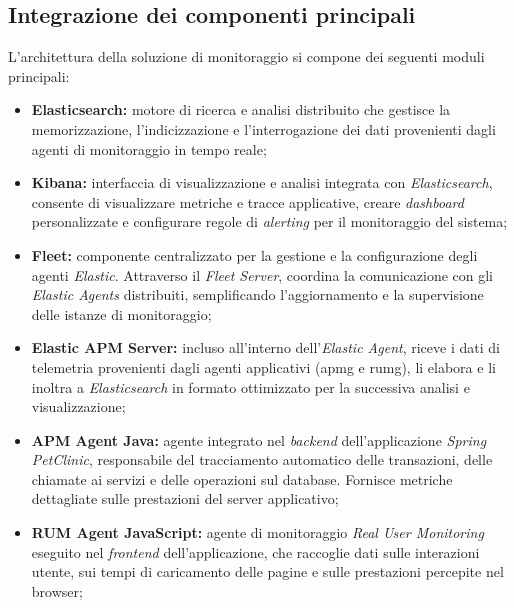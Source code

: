 \subsection{Integrazione dei componenti principali}
L'architettura della soluzione di monitoraggio si compone dei seguenti moduli principali:
\begin{itemize}
    \item \textbf{Elasticsearch:} motore di ricerca e analisi distribuito che gestisce la memorizzazione, l'indicizzazione e l'interrogazione dei dati provenienti dagli agenti di monitoraggio in tempo reale;
    
    \item \textbf{Kibana:} interfaccia di visualizzazione e analisi integrata con \emph{Elasticsearch}, consente di visualizzare metriche e tracce applicative, creare \emph{dashboard} personalizzate e configurare regole di \emph{alerting} per il monitoraggio del sistema;
    
    \item \textbf{Fleet:} componente centralizzato per la gestione e la configurazione degli agenti \emph{Elastic}. Attraverso il \emph{Fleet Server}, coordina la comunicazione con gli \emph{Elastic Agents} distribuiti, semplificando l'aggiornamento e la supervisione delle istanze di monitoraggio;
    
    \item \textbf{Elastic APM Server:} incluso all'interno dell'\emph{Elastic Agent}, riceve i dati di telemetria provenienti dagli agenti applicativi (\gls{apmg} e \gls{rumg}\glsfirstoccur), li elabora e li inoltra a \emph{Elasticsearch} in formato ottimizzato per la successiva analisi e visualizzazione;
    
    \item \textbf{APM Agent Java:} agente integrato nel \emph{backend} dell'applicazione \emph{Spring PetClinic}, responsabile del tracciamento automatico delle transazioni, delle chiamate ai servizi e delle operazioni sul database. Fornisce metriche dettagliate sulle prestazioni del server applicativo;
    
    \item \textbf{RUM Agent JavaScript:} agente di monitoraggio \emph{Real User Monitoring} eseguito nel \emph{frontend} dell'applicazione, che raccoglie dati sulle interazioni utente, sui tempi di caricamento delle pagine e sulle prestazioni percepite nel browser;
    
\end{itemize}


